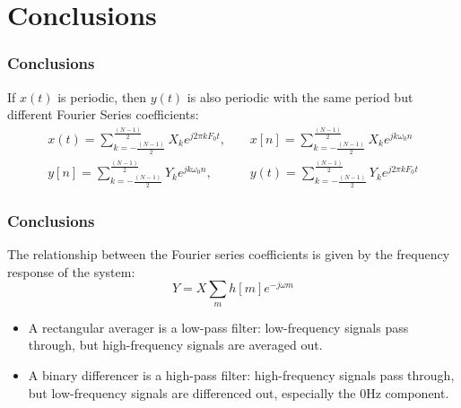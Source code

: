 \documentclass{beamer}
\begin{document}
\section{Conclusions}
\setcounter{subsection}{1}
\begin{frame}
  \frametitle{Conclusions}

  \begin{center}
  \end{center}
  If $x(t)$ is periodic, then $y(t)$ is also periodic with the same
  period but different Fourier Series coefficients:
  \begin{align*}
    x(t)=\sum_{k=-\frac{(N-1)}{2}}^{\frac{(N-1)}{2}}X_ke^{j2\pi kF_0t},~~~~~
    &x[n]=\sum_{k=-\frac{(N-1)}{2}}^{\frac{(N-1)}{2}}X_ke^{jk\omega_0n}\\
    y[n]=\sum_{k=-\frac{(N-1)}{2}}^{\frac{(N-1)}{2}}Y_ke^{jk\omega_0n},~~~~~
    &y(t)=\sum_{k=-\frac{(N-1)}{2}}^{\frac{(N-1)}{2}}Y_ke^{j2\pi kF_0t}
  \end{align*}  
\end{frame}

\begin{frame}
  \frametitle{Conclusions}

  The relationship between the Fourier series coefficients is given by
  the frequency response of the system:
  \begin{displaymath}
    Y = X \sum_m h[m]e^{-j\omega m}
  \end{displaymath}
  \begin{itemize}
  \item A rectangular averager is a low-pass filter: low-frequency
    signals pass through, but high-frequency signals are averaged out.
  \item A binary differencer is a high-pass filter: high-frequency
    signals pass through, but low-frequency signals are differenced
    out, especially the 0Hz component.
  \end{itemize}
\end{frame}
\end{document}
